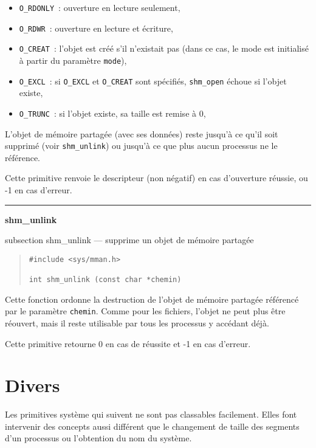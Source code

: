 \documentclass [twoside] {report}
\newcommand {\primitive} [1]
    {
	\phantomsection
	{\large \textbf {#1}}
	\addcontentsline {toc} {subsection} {#1}
    }
\newcommand {\separation}
    {
	\vspace {5mm}
	\nopagebreak
	\hrule
    }
\begin{document}
\begin {itemize}
    \item \texttt {O\_RDONLY}~: ouverture en lecture seulement,
    \item \texttt {O\_RDWR}~: ouverture en lecture et écriture,
    \item \texttt {O\_CREAT}~: l'objet est créé s'il n'existait pas
	(dans ce cas, le mode est initialisé à partir du paramètre
	\texttt {mode}),
    \item \texttt {O\_EXCL}~: si \texttt {O\_EXCL} et \texttt {O\_CREAT}
	sont spécifiés, \texttt {shm\_open} échoue si l'objet existe,
    \item \texttt {O\_TRUNC}~: si l'objet existe, sa taille est remise à 0,
\end {itemize}

L'objet de mémoire partagée (avec ses données) reste jusqu'à ce
qu'il soit supprimé (voir \texttt {shm\_unlink}) ou jusqu'à ce que
plus aucun processus ne le référence.

Cette primitive renvoie le descripteur
(non négatif) en cas d'ouverture
réussie, ou -1 en cas d'erreur.


\separation
\primitive {shm\_unlink} --- supprime un objet de mémoire partagée

\begin {quote}
\begin {verbatim}
#include <sys/mman.h>

int shm_unlink (const char *chemin)
\end{verbatim}
\end {quote}

Cette fonction ordonne la destruction de l'objet de mémoire partagée
référencé par le paramètre \texttt {chemin}. Comme pour les fichiers,
l'objet ne peut plus être réouvert, mais il reste utilisable par tous
les processus y accédant déjà.

Cette primitive retourne 0 en cas de réussite
et -1 en cas d'erreur.





\section {Divers}


Les primitives système qui suivent ne sont pas
classables facilement. Elles font intervenir des
concepts aussi différent que le changement de
taille des segments d'un processus ou l'obtention
du nom du système.
\end{document}
